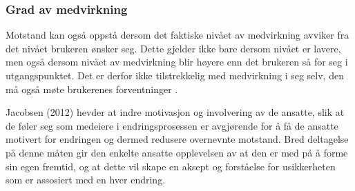 \subsubsection{Grad av medvirkning}
Motstand kan også oppstå dersom det faktiske nivået av medvirkning avviker fra det nivået brukeren ønsker seg. Dette gjelder ikke bare dersom nivået er lavere, men også dersom nivået av medvirkning blir høyere enn det brukeren så for seg i utgangspunktet. Det er derfor ikke tilstrekkelig med medvirkning i seg selv, den må også møte brukerenes forventninger \cite{Cavaye95}.

\noindent
Jacobsen (2012) hevder at indre motivasjon og involvering av de ansatte, slik at de føler seg som medeiere i endringsprosessen er avgjørende for å få de ansatte motivert for endringen og dermed redusere overnevnte motstand. Bred deltagelse på denne måten gir den enkelte ansatte opplevelsen av at den er med på å forme sin egen fremtid, og at dette vil skape en aksept og forståelse for usikkerheten som er assosiert med en hver endring.